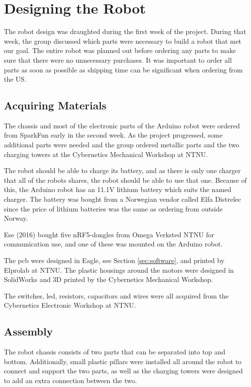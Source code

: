 \section{Designing the Robot}
\label{sec:robotdesign}
The robot design was draughted during the first week of the project. During that week, the group discussed which parts were necessary to build a robot that met our goal. The entire robot was planned out before ordering any parts to make sure that there were no unnecessary purchases. It was important to order all parts as soon as possible as shipping time can be significant when ordering from the US.

\subsection{Acquiring Materials}
The chassis and most of the electronic parts of the Arduino robot were ordered from SparkFun \cite{sparkfun} early in the second week. As the project progressed, some additional parts were needed and the group ordered metallic parts and the two charging towers at the Cybernetics Mechanical Workshop at NTNU.

The robot should be able to charge its battery, and as there is only one charger that all of the robots shares, the robot should be able to use that one. Because of this, the Arduino robot has an 11.1V lithium battery which suits the named charger. The battery was bought from a Norwegian vendor called Elfa Distrelec\cite{elfa} since the price of lithium batteries was the same as ordering from outside Norway.

Ese (2016) bought five nRF5-dongles from Omega Verksted NTNU  for communication use, and one of these was mounted on the Arduino robot.

The \acrshort{pcb} were designed in Eagle, see Section \ref{sec:software}, and printed by Elprolab\cite{elprolab} at NTNU. The plastic housings around the motors were designed in SolidWorks and 3D printed by the Cybernetics Mechanical Workshop.

The switches, \acrfull{led}, resistors, capacitors and wires were all acquired from the Cybernetics Electronic Workshop at NTNU.


\subsection{Assembly}
The robot chassis consists of two parts that can be separated into top and bottom. Additionally, small plastic pillars were installed all around the robot to connect and support the two parts, as well as the charging towers were designed to add an extra connection between the two.

